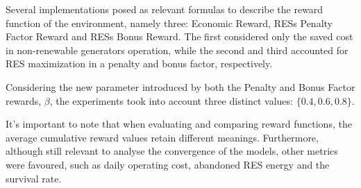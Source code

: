 Several implementations posed as relevant formulas to describe the reward function of the environment, namely three: Economic Reward, \acp{RES} Penalty Factor Reward and \acp{RES} Bonus Reward. The first considered only the saved cost in non-renewable generators operation, while the second and third accounted for \ac{RES} maximization in a penalty and bonus factor, respectively.
\par
Considering the new parameter introduced by both the Penalty and Bonus Factor rewards, $\beta$, the experiments took into account three distinct values: $\{0.4, 0.6, 0.8\}$.  \par
It's important to note that when evaluating and comparing reward functions, the average cumulative reward values retain different meanings. Furthermore, although still relevant to analyse the convergence of the models, other metrics were favoured, such as daily operating cost, abandoned \ac{RES} energy and the survival rate. \par


